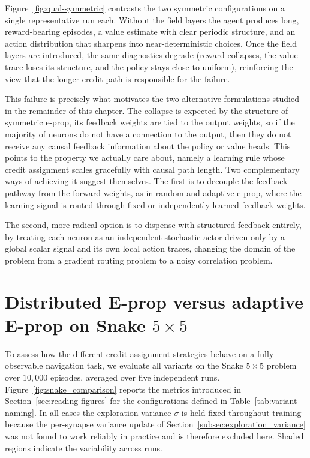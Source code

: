 Figure~\ref{fig:qual-symmetric} contrasts the two symmetric configurations on a single
representative run each. 
Without the field layers the agent produces long, reward-bearing episodes, a value
estimate with clear periodic structure, and an action distribution that sharpens into
near-deterministic choices. Once the field layers are introduced, the same diagnostics
degrade (reward collapses, the value trace loses its structure, and the policy stays
close to uniform), reinforcing the view that the longer credit path is responsible for the failure.

This failure is precisely what motivates the two alternative formulations studied in the
remainder of this chapter. The collapse is expected by the structure of symmetric e-prop, its feedback weights are
tied to the output weights, so if the majority of neurons do not have a connection to the output, then they do not receive any causal feedback information about the policy or value heads. This points to the property we
actually care about, namely a learning rule whose credit assignment scales gracefully with
causal path length. Two complementary ways of achieving it suggest themselves. The first is
to decouple the feedback pathway from the forward weights, as in random and adaptive e-prop,
where the learning signal is routed through fixed or independently learned feedback weights. 

The second, more radical option is to dispense with structured
feedback entirely, by treating each neuron as an independent stochastic actor
driven only by a global scalar signal and its own local action traces, changing the domain of the problem from a gradient routing problem to a noisy correlation problem.

\section{Distributed E-prop versus adaptive E-prop on Snake $5 \times 5$}
\label{sec:snake_comparison}

To assess how the different credit-assignment strategies behave on a fully observable
navigation task, we evaluate all variants on the Snake $5\times5$ problem over $10{,}000$
episodes, averaged over five independent runs. Figure~\ref{fig:snake_comparison} reports the
metrics introduced in Section~\ref{sec:reading-figures} for the configurations defined in
Table~\ref{tab:variant-naming}. In all cases the exploration variance $\sigma$ is held
fixed throughout training because the per-synapse variance
update of Section~\ref{subsec:exploration_variance} was not found to work reliably in practice and is
therefore excluded here. Shaded regions indicate the variability across runs.


